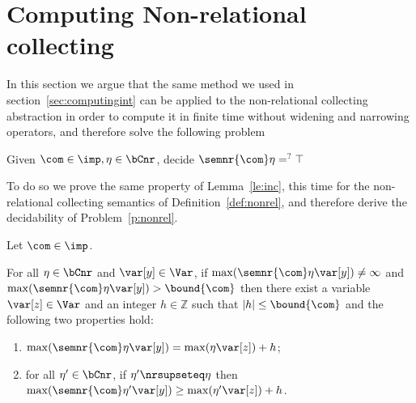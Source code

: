 \section{Computing Non-relational collecting}
\label{sec:computingnonrel}

In this section we argue that the same method we used in
section~\ref{sec:computingint} can be applied to the non-relational
collecting abstraction in order to compute it in finite time without
widening and narrowing operators, and therefore solve the following
problem

\begin{problem}\label{p:nonrel}
  Given \(\com\in\imp, \eta \in \bCnr\), decide
  \(\semnr{\com}\eta =^? \top\)
\end{problem}

To do so we prove the same property of Lemma~\ref{le:inc}, this time
for the non-relational collecting semantics of
Definition~\ref{def:nonrel}, and therefore derive the decidability of
Problem~\ref{p:nonrel}.

\begin{lemma}
  \label{le:incnr}
  Let \(\com\in \imp\). %
    
  \noindent
  For all \(\eta \in \bCnr\) and \(\var[y] \in \Var\), if
  \(\max(\semnr{\com} \eta \var[y]) \neq \infty\) and
  \(\max(\semnr{\com}\eta \var[y]) > \bound{\com}\) then there exist a
  variable \(\var[z] \in \Var\) and an integer \(h \in \mathbb{Z}\)
  such that \(|h| \leq \bound{\com}\) and the following two properties
  hold:
  \begin{enumerate}[label=(\roman*)]
  \item \(\max(\semnr{\com}\eta \var[y]) = \max(\eta \var[z]) + h\); \label{point1nr}
  \item  for all \(\eta' \in \bCnr\), if \(\eta' \nrsupseteq \eta\)
    then
    \(\max(\semnr{\com}\eta' \var[y]) \geq \max(\eta' \var[z]) + h\). \label{point2nr}
  \end{enumerate}
\end{lemma}

